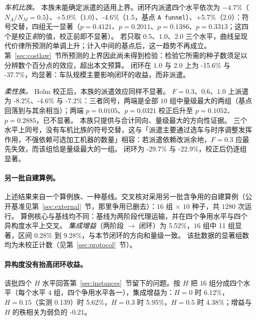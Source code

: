 \documentclass[manuscript,screen,review]{acmart}
\newcommand{\NCases}{10}
\newcommand{\GainProbeStarve}{4.7\%}     %
\newcommand{\GainProbeFleetBase}{-4.6\%} %
\newcommand{\GainProbeFleetOne}{+5.0\%}  %
\newcommand{\GainProbeFleetTwo}{+5.7\%}  %
\newcommand{\GainLoopFleetOne}{-15.6\%}  %
\newcommand{\GainLoopFleetTwo}{-37.7\%}  %
\newcommand{\GainLoopFlexLo}{-29.7\%}    %
\newcommand{\GainLoopFlexHi}{-22.9\%}    %
\newcommand{\GainProbeFlexLo}{-8.2\%}    %
\newcommand{\GainProbeFlexHi}{-7.2\%}    %
\newcommand{\PProbeFleetHalfRaw}{=0.4121}
\newcommand{\PProbeFleetOneRaw}{=0.2011}
\newcommand{\PProbeFleetBaseRaw}{=0.1386}
\newcommand{\PProbeFleetTwoRaw}{=0.3313}
\newcommand{\PProbeFlexLoRaw}{=0.0105}
\newcommand{\PProbeFlexLoHolm}{=0.1052}
\newcommand{\PProbeFlexHiRaw}{=0.0321}
\newcommand{\PProbeFlexHiHolm}{=0.2885}
\newcommand{\MatrixCells}{16}
\newcommand{\MatrixRuns}{1280}
\newcommand{\GainIntegMatrix}{5.52\%}    %
\newcommand{\SigIntegMatrix}{11}         %
\newcommand{\GainIntegMatrixLo}{0.28\%}
\newcommand{\GainIntegMatrixHi}{9.28\%}
\newcommand{\GainIntegHZero}{6.12\%}
\newcommand{\GainIntegHLow}{5.62\%}      %
\newcommand{\GainIntegHMid}{5.95\%}      %
\newcommand{\GainIntegHHigh}{4.38\%}     %
\newcommand{\MatrixHMeasLow}{0.139}      %
\newcommand{\RhoIntegH}{-0.21}           %
\begin{document}
\emph{车机比族。}
本族未能确定派遣的适用上界。闭环内派遣四个水平依次为 $-\GainProbeStarve$（$N_A/N_M=0.5$）、\GainProbeFleetOne{}（$1.0$）、\GainProbeFleetBase{}（$1.5$，基点 \texttt{A funnel}）、\GainProbeFleetTwo{}（$2.0$）：符号交替，四组无一显著（$p\PProbeFleetHalfRaw$、$p\PProbeFleetOneRaw$、$p\PProbeFleetBaseRaw$、$p\PProbeFleetTwoRaw$；这四个是校正\emph{前}的值，校正前即不显著）。
若只取 $0.5$、$1.0$、$2.0$ 三个水平，曲线呈现代价律所预测的单调上升；计入中间的基点后，这一趋势不再成立。
第~\ref{sec:costlaw}~节所预测的上界因此尚未得到检验：检验它所需的种子数须足以分辨数个百分点的效应，超出本文预算。
闭环在 $1.0$ 与 $2.0$ 上为 \GainLoopFleetOne{} 与 \GainLoopFleetTwo{}，均显著：车队规模主要影响闭环的收益，而非派遣。

\emph{柔性族。}
Holm 校正后，本族的派遣效应同样不显著。
$F=0.3$、$0.6$、$1.0$ 上派遣为 \GainProbeFlexLo{}、\GainProbeFleetBase{} 与 \GainProbeFlexHi{}：三者同号，两端是全部 $\NCases$ 组中量级最大的两组（基点回落到与其余相当）；两端 $p\PProbeFlexLoRaw$、$p\PProbeFlexHiRaw$ 校正后升至 $p\PProbeFlexLoHolm$、$p\PProbeFlexHiHolm$，已不显著。
本族只提供与合计同向、量级最大的方向性证据。
三个水平上同号，没有车机比族的符号交替，这与「派遣主要通过选车与时序调整发挥作用，不强依赖可选加工机器的数量」相容：若派遣依赖改派余地，$F=0.3$ 应最先失效，而该组恰是量级最大的一组。
闭环为 \GainLoopFlexLo{} 与 \GainLoopFlexHi{}，校正后仍逐组显著。

\paragraph{另一批自建算例。}
上述结果来自一个算例族、一种基线。交叉核对采用另一批含争用的自建算例（公开基准见第~\ref{sec:external}~节，那里争用已删去）：$\MatrixCells$ 组 $\times$ $10$ 种子，共 $\MatrixRuns$ 次运行。
算例核心与基线均不同：基线为两阶段代理运输，并在四个争用水平与四个异构度水平上交叉。
\emph{集成增益}（两阶段 $\to$ 闭环）为 \GainIntegMatrix{}，$\MatrixCells$ 组中 \SigIntegMatrix{} 组显著，区间 \GainIntegMatrixLo{} 到 \GainIntegMatrixHi{}，与本节闭环的方向和量级一致。
该批数据的显著组数均为未校正计数（见第~\ref{sec:protocol}~节）。

\paragraph{异构度没有抬高闭环收益。}
该批四个 $H$ 水平回答第~\ref{sec:instances}~节留下的问题。按 $H$ 把 $\MatrixCells$ 组分成四个水平（每个水平 $4$ 组，四个争用水平各一），集成增益为：$H=0$ 时 \GainIntegHZero{}，$H=0.15$（实测 \MatrixHMeasLow{}）时 \GainIntegHLow{}，$H=0.3$ 时 \GainIntegHMid{}，$H=0.5$ 时 \GainIntegHHigh{}；增益与 $H$ 的秩相关为弱负的 \RhoIntegH{}。
\end{document}
